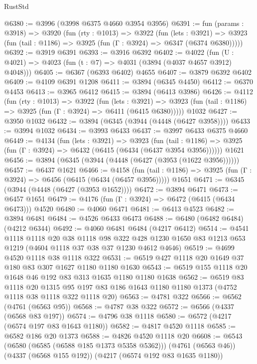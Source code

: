 \begin{lexlean}{RustStd}
\begin{coremodule}
@6380 := @3996 (@3998 @6375 @4660 @3954 @3956)
@6391 := fun (params : @3918) =>
  @3920
    (fun (rty : @1013) =>
    @3922
      (fun (lets : @3921) =>
      @3923 (fun (tail : @1186) => @3925 (fun (Γ : @3924) => @6347 (@6374 @6380)))))
@6392 := @3919 @6391
@6393 := @3916 @6392
@6402 := @4022 (fun (U : @4021) => @4023 (fun (t : @7) => @4031 (@3894 (@4037 @4657 @3912) @4048)))
@6405 := @6367 (@6393 @6402) @4655
@6407 := @3879 @6392 @6402
@6409 := @4109 @6391 @1208
@6411 := @3894 (@6345 @4450)
@6412 := @6370 @4453
@6413 := @3965 @6412
@6415 := @3894 (@6413 @3986)
@6426 := @4112
    (fun (rty : @1013) =>
    @3922
      (fun (lets : @3921) =>
      @3923 (fun (tail : @1186) => @3925 (fun (Γ : @3924) => @6411 (@6415 @6380)))))
    @1032
@6427 := @3950 @1032
@6432 := @3894 (@6345 (@3944 (@4448 (@6427 @3958))))
@6433 := @3994 @1032
@6434 := @3993 @6433
@6437 := @3997 @6433 @6375 @4660
@6449 := @4134
    (fun (lets : @3921) =>
    @3923
      (fun (tail : @1186) => @3925 (fun (Γ : @3924) => @6432 (@6415 (@6434 (@6437 @3954 @3956))))))
    @1621
@6456 := @3894 (@6345 (@3944 (@4448 (@6427 (@3953 (@1622 @3956))))))
@6457 := @6437 @1621
@6466 := @4158
    (fun (tail : @1186) => @3925 (fun (Γ : @3924) => @6456 (@6415 (@6434 (@6457 @3956)))))
    @1651
@6471 := @6345 (@3944 (@4448 (@6427 (@3953 @1652))))
@6472 := @3894 @6471
@6473 := @6457 @1651
@6479 := @4176 (fun (Γ : @3924) => @6472 (@6415 (@6434 @6473))) @4520
@6480 := @4060 @6471
@6481 := @6413 @4523
@6482 := @3894 @6481
@6484 := @4526 @6433 @6473
@6488 := @6480 (@6482 @6484) (@4212 @6344)
@6492 := @4060 @6481 @6484 (@4217 @6412)
@6514 := @4541
    @1118
    @1118
    @20
    @38
    @1118
    @98
    @322
    @428
    @1230
    @1650
    @83
    @1213
    @653
    @1219
    (@4604 @1118 @37 @38 @37 @1230 @4612 @4646)
@6519 := @4699 @4520 @1118 @38 @1118 @322
@6531 := @6519 @427 @1118 @20 @1649 @37 @180 @83 @307 @1627 @1180 @1180 @1630
@6543 := @6519 @155 @1118 @20 @1648 @46 @192 @83 @313 @1635 @1180 @1180 @1638
@6562 := @6519
    @83
    @1118
    @20
    @1315
    @95
    @197
    @83
    @186
    @1643
    @1180
    @1180
    @1373
    (@4752 @1118 @38 @1118 @322 @1118 @20)
@6563 := @4781 @322
@6566 := @6562 (@4761 (@6563 @95))
@6568 := @4787 @38 @322
@6572 := @6566 (@4337 (@6568 @83 @197))
@6574 := @4796 @38 @1118
@6580 := @6572 (@4217 (@6574 @197 @83 @1643 @1180))
@6582 := @4817 @4520 @1118
@6585 := @6582 @186 @20 @1373
@6588 := @4826 @4520 @1118 @20
@6608 := @6543
    (@6580 (@6585 (@6588 @185 @1373 @5358 @5362)))
    (@4761 (@6563 @46))
    (@4337 (@6568 @155 @192))
    (@4217 (@6574 @192 @83 @1635 @1180))

\end{coremodule}
\end{lexlean}
